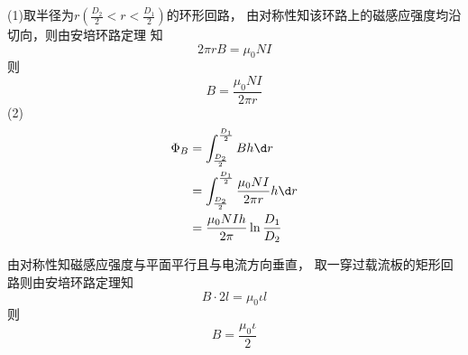 \documentclass{phyasgn}
\begin{document}
\begin{sol}[2-21]
(1)取半径为$r$$(\frac{D_2}{2}<r<\frac{D_1}{2})$的环形回路，
由对称性知该环路上的磁感应强度均沿切向，则由安培环路定理
知
$$
2\pi r B=\mu_0 NI
$$
则
$$
B=\frac{\mu_0NI}{2\pi r}
$$
(2)$$\begin{aligned}
    \Phi_B&=\int_{\frac{D_2}{2}}^{\frac{D_1}{2}}Bh\d r\\
    &=\int_{\frac{D_2}{2}}^{\frac{D_1}{2}}\frac{\mu_0NI}{2\pi r}h\d r\\
    &=\frac{\mu_0NIh}{2\pi}\ln\frac{D_1}{D_2}
\end{aligned}$$
\end{sol}\par

\begin{sol}[2-22]
    由对称性知磁感应强度与平面平行且与电流方向垂直，
    取一穿过载流板的矩形回路则由安培环路定理知
    $$B\cdot 2l=\mu_0\iota l$$
    则$$B=\frac{\mu_0\iota}{2}$$
\end{sol}\par
\end{document}
